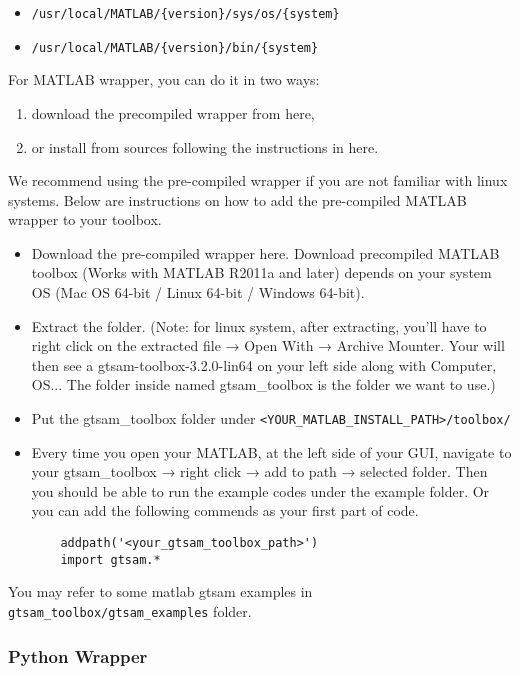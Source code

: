 \documentclass[tp]{lcc}
\begin{document}
\begin{itemize}
    \item \texttt{/usr/local/MATLAB/\{version\}/sys/os/\{system\}}
    \item \texttt{/usr/local/MATLAB/\{version\}/bin/\{system\}}
\end{itemize}

For MATLAB wrapper, you can do it in two ways:

\begin{enumerate}
    \item download the precompiled wrapper from here,
    \item or install from sources following the instructions in here.
\end{enumerate}

We recommend using the pre-compiled wrapper if you are not familiar with linux systems. Below are instructions on how to add the pre-compiled MATLAB wrapper to your toolbox.

\begin{itemize}
    \item Download the pre-compiled wrapper here. Download precompiled MATLAB toolbox (Works with MATLAB R2011a and later) depends on your system OS (Mac OS 64-bit / Linux 64-bit / Windows 64-bit).
    \item Extract the folder. (Note: for linux system, after extracting, you'll have to right click on the extracted file → Open With → Archive Mounter. Your will then see a gtsam-toolbox-3.2.0-lin64 on your left side along with Computer, OS... The folder inside named gtsam\_toolbox is the folder we want to use.)
    \item Put the gtsam\_toolbox folder under \texttt{<YOUR\_MATLAB\_INSTALL\_PATH>/toolbox/}
    \item Every time you open your MATLAB, at the left side of your GUI, navigate to your gtsam\_toolbox → right click → add to path → selected folder. Then you should be able to run the example codes under the example folder. Or you can add the following commends as your first part of code.
    \begin{verbatim}
    addpath('<your_gtsam_toolbox_path>')
    import gtsam.*
    \end{verbatim}
\end{itemize}

You may refer to some matlab gtsam examples in \texttt{gtsam\_toolbox/gtsam\_examples} folder.

\subsubsection{Python Wrapper}
\end{document}
